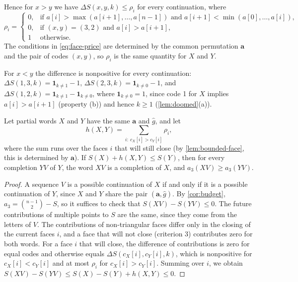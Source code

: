 Hence for $x>y$ we have $\Delta S(x,y,k)\le\rho_i$ for every continuation, where
\begin{equation}\label{eq:face-price}
\rho_i=\begin{cases}
0,&\text{if }a[i]>\max(a[i+1],\ldots,a[n-1])\text{ and }a[i+1]<\min(a[0],\ldots,a[i]),\\
0,&\text{if }(x,y)=(3,2)\text{ and }a[i]>a[i+1],\\
1&\text{otherwise.}
\end{cases}
\end{equation}
The conditions in \eqref{eq:face-price} are determined by the common permutation $\mathbf a$ and the pair of codes $(x,y)$, so $\rho_i$ is the same quantity for $X$ and $Y$.

For $x<y$ the difference is nonpositive for every continuation: $\Delta S(1,3,k)=\mathbf 1_{k\ne1}-1$, $\Delta S(2,3,k)=\mathbf 1_{k\ne0}-1$, and $\Delta S(1,2,k)=\mathbf 1_{k\ne1}-\mathbf 1_{k\ne0}$, where $\mathbf 1_{k\ne0}=1$, since code 1 for $X$ implies $a[i]>a[i+1]$ (property (b)) and hence $k\ge1$ (\cref{lem:doomed}(a)).

\begin{lemma}[dominance]\label{lem:dominance}
Let partial words $X$ and $Y$ have the same $\mathbf a$ and $\widehat g$, and let
\[
h(X,Y)=\sum_{i:\ c_X[i]>c_Y[i]}\rho_i ,
\]
where the sum runs over the faces $i$ that will still close (by \cref{lem:bounded-face}, this is determined by $\mathbf a$).
If $S(X)+h(X,Y)\le S(Y)$, then for every completion $YV$ of $Y$, the word $XV$ is a completion of $X$, and $a_3(XV)\ge a_3(YV)$.
\end{lemma}

\begin{proof}
A sequence $V$ is a possible continuation of $X$ if and only if it is a possible continuation of $Y$, since $X$ and $Y$ share the pair $(\mathbf a,\widehat g)$.
By \cref{cor:budget}, $a_3=\binom{n-1}2-S$, so it suffices to check that $S(XV)-S(YV)\le0$.
The future contributions of multiple points to $S$ are the same, since they come from the letters of $V$.
The contributions of non-triangular faces differ only in the closing of the current faces $i$, and a face that will not close (criterion 3) contributes zero for both words.
For a face $i$ that will close, the difference of contributions is zero for equal codes and otherwise equals $\Delta S(c_X[i],c_Y[i],k)$, which is nonpositive for $c_X[i]<c_Y[i]$ and at most $\rho_i$ for $c_X[i]>c_Y[i]$.
Summing over $i$, we obtain $S(XV)-S(YV)\le S(X)-S(Y)+h(X,Y)\le0$.
\end{proof}

